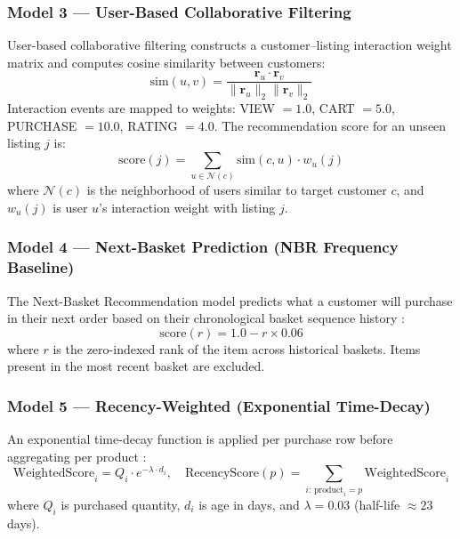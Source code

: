 \subsubsection{Model 3 --- User-Based Collaborative Filtering}
User-based collaborative filtering \cite{Resnick1994, Sarwar2001} constructs a customer--listing interaction weight matrix and computes cosine similarity between customers:
\begin{equation}
\text{sim}(u, v) = \frac{\mathbf{r}_u \cdot \mathbf{r}_v}{\|\mathbf{r}_u\|_2 \|\mathbf{r}_v\|_2}
\label{eqn:cosine_cf}
\end{equation}
Interaction events are mapped to weights: VIEW $= 1.0$, CART $= 5.0$, PURCHASE $= 10.0$, RATING $= 4.0$. The recommendation score for an unseen listing $j$ is:
\begin{equation}
\text{score}(j) = \sum_{u \in \mathcal{N}(c)} \text{sim}(c, u) \cdot w_u(j)
\label{eqn:cf_score}
\end{equation}
where $\mathcal{N}(c)$ is the neighborhood of users similar to target customer $c$, and $w_u(j)$ is user $u$'s interaction weight with listing $j$.

\subsubsection{Model 4 --- Next-Basket Prediction (NBR Frequency Baseline)}
The Next-Basket Recommendation model predicts what a customer will purchase in their next order based on their chronological basket sequence history \cite{Yu2016}:
\begin{equation}
\text{score}(r) = 1.0 - r \times 0.06
\label{eqn:next_basket}
\end{equation}
where $r$ is the zero-indexed rank of the item across historical baskets. Items present in the most recent basket are excluded.

\subsubsection{Model 5 --- Recency-Weighted (Exponential Time-Decay)}
An exponential time-decay function is applied per purchase row before aggregating per product \cite{Ding2005, Koren2010}:
\begin{equation}
\text{WeightedScore}_i = Q_i \cdot e^{-\lambda \cdot d_i}, \quad \text{RecencyScore}(p) = \sum_{i:\,\text{product}_i = p} \text{WeightedScore}_i
\label{eqn:rw_product}
\end{equation}
where $Q_i$ is purchased quantity, $d_i$ is age in days, and $\lambda = 0.03$ (half-life $\approx 23$ days).

